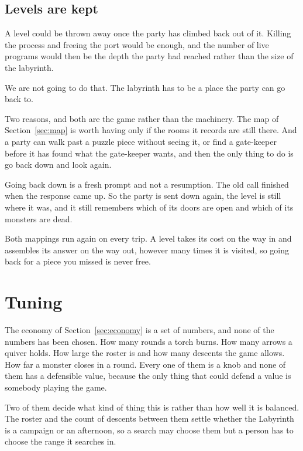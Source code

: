 \documentclass[11pt,a4paper]{article}
\begin{document}
\subsection{Levels are kept}
\label{sec:kept}

A level could be thrown away once the party has climbed back out of it. Killing the process and
freeing the port would be enough, and the number of live programs would then be the depth the
party had reached rather than the size of the labyrinth.

We are not going to do that. The labyrinth has to be a place the party can go back to.

Two reasons, and both are the game rather than the machinery. The map of Section~\ref{sec:map} is
worth having only if the rooms it records are still there. And a party can walk past a puzzle
piece without seeing it, or find a gate-keeper before it has found what the gate-keeper wants, and then the
only thing to do is go back down and look again.

Going back down is a fresh prompt and not a resumption. The old call finished when the response
came up. So the party is sent down again, the level is still where it was, and it still remembers
which of its doors are open and which of its monsters are dead.

\begin{sectionbox}
Both mappings run again on every trip. A level takes its cost on the way in and assembles its
answer on the way out, however many times it is visited, so going back for a piece you missed is
never free.
\end{sectionbox}

\newpage

\section{Tuning}
\label{sec:tune}

The economy of Section~\ref{sec:economy} is a set of numbers, and none of the numbers has been
chosen. How many rounds a torch burns. How many arrows a quiver holds. How large the roster is
and how many descents the game allows. How far a monster closes in a round. Every one of them is a
knob and none of them has a defensible value, because the only thing that could defend a value is
somebody playing the game.

Two of them decide what kind of thing this is rather than how well it is balanced. The roster and
the count of descents between them settle whether the Labyrinth is a campaign or an afternoon, so
a search may choose them but a person has to choose the range it searches in.
\end{document}
